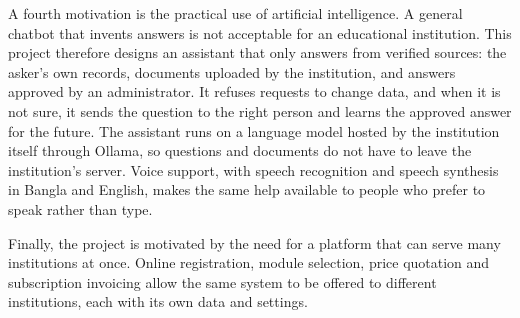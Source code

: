 A fourth motivation is the practical use of artificial intelligence. A general chatbot that invents answers is not acceptable for an educational institution. This project therefore designs an assistant that only answers from verified sources: the asker's own records, documents uploaded by the institution, and answers approved by an administrator. It refuses requests to change data, and when it is not sure, it sends the question to the right person and learns the approved answer for the future. The assistant runs on a language model hosted by the institution itself through Ollama, so questions and documents do not have to leave the institution's server. Voice support, with speech recognition and speech synthesis in Bangla and English, makes the same help available to people who prefer to speak rather than type.

Finally, the project is motivated by the need for a platform that can serve many institutions at once. Online registration, module selection, price quotation and subscription invoicing allow the same system to be offered to different institutions, each with its own data and settings.

